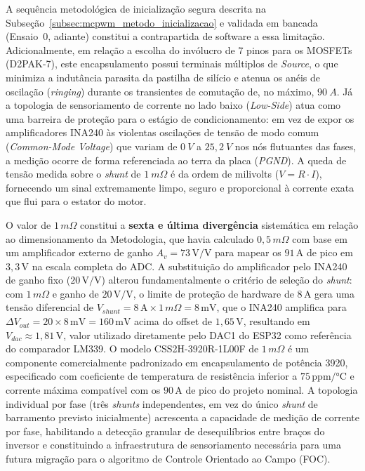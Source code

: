 A sequência metodológica de inicialização segura descrita na Subseção~\ref{subsec:mcpwm_metodo_inicializacao} e validada em bancada (Ensaio~0, adiante) constitui a contrapartida de software a essa limitação. Adicionalmente, em relação a escolha do invólucro de 7 pinos para os MOSFETs (D2PAK-7), este encapsulamento possui terminais múltiplos de \textit{Source}, o que minimiza a indutância parasita da pastilha de silício e atenua os anéis de oscilação (\textit{ringing}) durante os transientes de comutação de, no máximo, $90 \: A$. Já a topologia de sensoriamento de corrente no lado baixo (\textit{Low-Side}) atua como uma barreira de proteção para o estágio de condicionamento: em vez de expor os amplificadores INA240 às violentas oscilações de tensão de modo comum (\textit{Common-Mode Voltage}) que variam de $0 \: V$ a $25,2 \: V$ nos nós flutuantes das fases, a medição ocorre de forma referenciada ao terra da placa (\textit{PGND}). A queda de tensão medida sobre o \textit{shunt} de $1 \: m\Omega$ é da ordem de milivolts ($V = R \cdot I$), fornecendo um sinal extremamente limpo, seguro e proporcional à corrente exata que flui para o estator do motor.

O valor de $1\,m\Omega$ constitui a \textbf{sexta e última divergência} sistemática em relação ao dimensionamento da Metodologia, que havia calculado $0{,}5\,m\Omega$ com base em um amplificador externo de ganho $A_v = 73\,\text{V/V}$ para mapear os $91\,\text{A}$ de pico em $3{,}3\,\text{V}$ na escala completa do ADC. A substituição do amplificador pelo INA240 de ganho fixo ($20\,\text{V/V}$) alterou fundamentalmente o critério de seleção do \textit{shunt}: com $1\,m\Omega$ e ganho de $20\,\text{V/V}$, o limite de proteção de hardware de $8\,\text{A}$ gera uma tensão diferencial de $V_{shunt} = 8\,\text{A} \times 1\,m\Omega = 8\,\text{mV}$, que o INA240 amplifica para $\Delta V_{out} = 20 \times 8\,\text{mV} = 160\,\text{mV}$ acima do offset de $1{,}65\,\text{V}$, resultando em $V_{dac} \approx 1{,}81\,\text{V}$, valor utilizado diretamente pelo DAC1 do ESP32 como referência do comparador LM339. O modelo CSS2H-3920R-1L00F de $1\,m\Omega$ é um componente comercialmente padronizado em encapsulamento de potência 3920, especificado com coeficiente de temperatura de resistência inferior a $75\,\text{ppm/°C}$ e corrente máxima compatível com os $90\,\text{A}$ de pico do projeto nominal. A topologia individual por fase (três \textit{shunts} independentes, em vez do único \textit{shunt} de barramento previsto inicialmente) acrescenta a capacidade de medição de corrente por fase, habilitando a detecção granular de desequilíbrios entre braços do inversor e constituindo a infraestrutura de sensoriamento necessária para uma futura migração para o algoritmo de Controle Orientado ao Campo (FOC).

